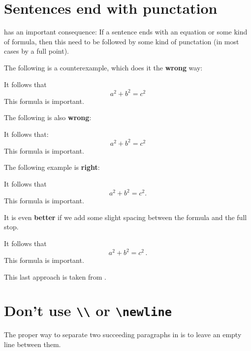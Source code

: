 \documentclass[a4paper, 10pt, abstract=on, headings=standardclasses]{scrartcl}
\begin{document}
\section{Sentences end with punctation}

 has an important consequence:
If a sentence ends with an equation or some kind of formula, then this need to be followed by some kind of punctation (in most cases by a full point).

The following is a counterexample, which does it the \textbf{wrong} way:
\begin{LTXexample}[pos=r]
  It follows that
  \[
    a^2 + b^2 = c^2
  \]
  This formula is important.
\end{LTXexample}
The following is also \textbf{wrong}:
\begin{LTXexample}[pos=r]
  It follows that:
  \[
    a^2 + b^2 = c^2
  \]
  This formula is important.
\end{LTXexample}
The following example is \textbf{right}:
\begin{LTXexample}[pos=r]
  It follows that
  \[
    a^2 + b^2 = c^2.
  \]
  This formula is important.
\end{LTXexample}
It is even \textbf{better} if we add some slight spacing between the formula and the full stop.
\begin{LTXexample}[pos=r]
  It follows that
  \[
    a^2 + b^2 = c^2 \,.
  \]
  This formula is important.
\end{LTXexample}
This last approach is taken from \cite{tex_period}.





\section{Don’t use \texttt{\textbackslash\textbackslash} or \texttt{{\textbackslash}newline}}

The proper way to separate two succeeding paragraphs in  is to leave an empty line between them.
\end{document}
